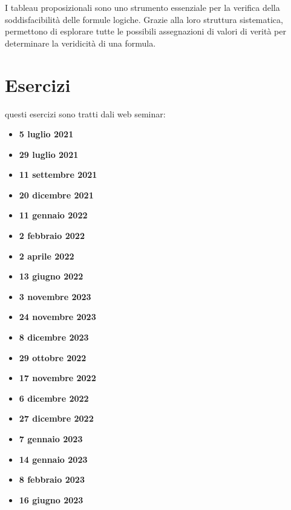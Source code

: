 \documentclass{article}
\begin{document}
I tableau proposizionali sono uno strumento essenziale per la verifica della soddisfacibilità delle formule logiche. Grazie alla loro struttura sistematica, permettono di esplorare tutte le possibili assegnazioni di valori di verità per determinare la veridicità di una formula.

\newpage
\section{Esercizi}
questi esercizi sono tratti dali web seminar:
\begin{itemize}
    \item \textbf{5 luglio 2021}
    \item \textbf{29 luglio 2021}
    \item \textbf{11 settembre 2021}
    \item \textbf{20 dicembre 2021}
    \item \textbf{11 gennaio 2022}
    \item \textbf{2 febbraio 2022}
    \item \textbf{2 aprile 2022}
    \item \textbf{13 giugno 2022}
    \item \textbf{3 novembre 2023}
    \item \textbf{24 novembre 2023}
    \item \textbf{8 dicembre 2023}
    \item \textbf{29 ottobre 2022}
    \item \textbf{17 novembre 2022}    
    \item \textbf{6 dicembre 2022}
    \item \textbf{27 dicembre 2022}
    \item \textbf{7 gennaio 2023}
    \item \textbf{14 gennaio 2023}
    \item \textbf{8 febbraio 2023}
    \item \textbf{16 giugno 2023}
\end{itemize}
\end{document}
